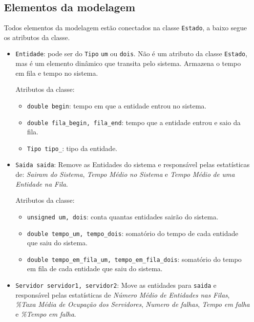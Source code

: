 \documentclass{article}
\begin{document}
\subsection{Elementos da modelagem}
Todos elementos da modelagem estão conectados na classe \texttt{Estado}, a baixo segue os
atributos da classe.
\begin{itemize}
  \item \texttt{Entidade}: pode ser do \texttt{Tipo} \texttt{um} ou \texttt{dois}. Não 
    é um atributo da classe \texttt{Estado}, mas é um elemento dinâmico que transita pelo
    sistema. Armazena o tempo em fila e tempo no sistema.
    
    Atributos da classe:
     \begin{itemize}
       \item  \texttt{double begin}: tempo em que a entidade entrou no sistema.
       \item  \texttt{double fila\_begin, fila\_end}: tempo que a entidade entrou e saio da
         fila.
       \item \texttt{Tipo tipo\_}: tipo da entidade.
     \end{itemize}

  \item \texttt{Saida saida}: Remove as Entidades do sistema e responsável pelas
    estatísticas de: \textit{Sairam do Sistema}, \textit{Tempo Médio no Sistema} e
    \textit{Tempo Médio de uma Entidade na Fila}.

    Atributos da classe:
   \begin{itemize}
     \item \texttt{unsigned um, dois}: conta quantas entidades sairão do sistema.
     \item \texttt{double tempo\_um, tempo\_dois}: somatório do tempo de cada entidade 
       que saiu do sistema.
     \item \texttt{double tempo\_em\_fila\_um, tempo\_em\_fila\_dois}: somatório do
       tempo em fila de cada entidade que saiu do sistema.
   \end{itemize}

  \item \texttt{Servidor servidor1, servidor2}: Move as entidades para \texttt{saida} e 
    responsável pelas estatísticas de \textit{Número Médio de Entidades nas Filas},
    \textit{\%Taxa Média de Ocupação dos Servidores}, \textit{Numero de falhas},
    \textit{Tempo em falha} e \textit{\%Tempo em falha}.


\end{itemize}
\end{document}
